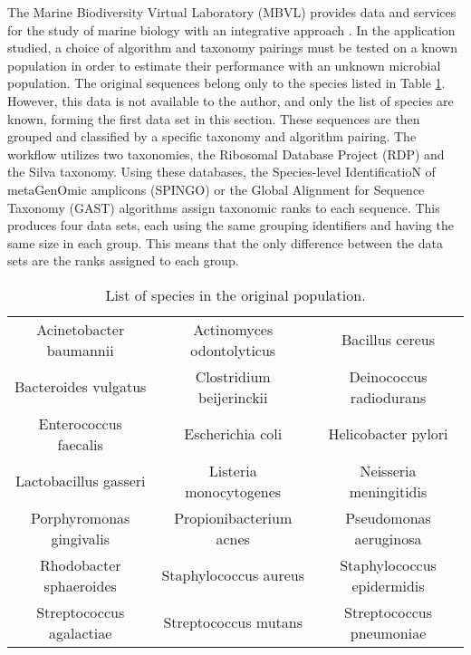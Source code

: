 The Marine Biodiversity Virtual Laboratory (MBVL) provides data and services for the study of marine biology with an integrative approach \cite{mbvl}.
In the application studied, a choice of algorithm and taxonomy pairings must be tested on a known population in order to estimate their performance with an unknown microbial population.
The original sequences belong only to the species listed in Table \ref{species_table}.
However, this data is not available to the author, and only the list of species are known, forming the first data set in this section.
These sequences are then grouped and classified by a specific taxonomy and algorithm pairing.
The workflow utilizes two taxonomies, the Ribosomal Database Project (RDP) and the Silva taxonomy.
Using these databases, the Species-level IdentificatioN of metaGenOmic amplicons (SPINGO) or the Global Alignment for Sequence Taxonomy (GAST) algorithms assign taxonomic ranks to each sequence.
This produces four data sets, each using the same grouping identifiers and having the same size in each group.
This means that the only difference between the data sets are the ranks assigned to each group.

\begin{table}
	\caption{List of species in the original population.}
	\label{species_table}
	\centering
	\setlength{\tabcolsep}{2pt}
	\begin{tabular}{|c|c|c|}
			\hline
			Acinetobacter baumannii & Actinomyces odontolyticus & Bacillus cereus \\
			Bacteroides vulgatus & Clostridium beijerinckii & Deinococcus radiodurans \\
			Enterococcus faecalis & Escherichia coli & Helicobacter pylori \\
			Lactobacillus gasseri & Listeria monocytogenes & Neisseria meningitidis\\
			Porphyromonas gingivalis & Propionibacterium acnes & Pseudomonas aeruginosa \\
			Rhodobacter sphaeroides & Staphylococcus aureus & Staphylococcus epidermidis\\
			Streptococcus agalactiae & Streptococcus mutans & Streptococcus pneumoniae \\
			\hline
	\end{tabular}
\end{table}
